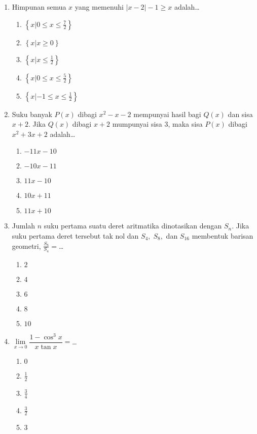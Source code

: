 \documentclass[A4,12PT, english, twocolumn]{journal}
\begin{document}
\begin{enumerate}
\item Himpunan semua $x$ yang memenuhi $|x-2|-1 \geq x$ adalah\dots
    \begin{enumerate}
        \item $\left\{ x|0 \leq x \leq \frac{7}{2} \right\}$
        \item $\left\{ x|x \geq 0 \right\}$
        \item $\left\{ x|x \leq \frac{1}{2} \right\}$
        \item $\left\{ x|0 \leq x \leq \frac{5}{2} \right\}$
        \item $\left\{ x|-1 \leq x \leq \frac{1}{2} \right\}$
    \end{enumerate}

\item Suku banyak $P(x)$ dibagi $x^2-x-2$ mempunyai hasil bagi $Q(x)$ dan sisa $x+2$. Jika $Q(x)$ dibagi $x+2$ mumpunyai sisa $3$, maka sisa $P(x)$ dibagi $x^2+3x+2$ adalah\dots
    \begin{enumerate}
        \item $-11x-10$
        \item $-10x-11$
        \item $11x-10$
        \item $10x+11$
        \item $11x+10$
    \end{enumerate}

\item Jumlah $n$ suku pertama suatu deret aritmatika dinotasikan dengan $S_n$. Jika suku pertama deret tersebut tak nol dan $S_4, \; S_8,$ dan $S_{16}$ membentuk barisan geometri, $\frac{S_8}{S_4}=$\dots
    \begin{enumerate}
        \item $2$
        \item $4$
        \item $6$
        \item $8$
        \item $10$
    \end{enumerate}

\item $\lim\limits_{x \longrightarrow 0} \dfrac{1-\cos^3{x}}{x \tan {x}}=$\dots
    \begin{enumerate}
        \item $0$
        \item $\frac{1}{2}$
        \item $\frac{3}{4}$
        \item $\frac{3}{2}$
        \item $3$
    \end{enumerate}


\end{enumerate}
\end{document}
